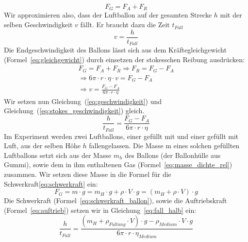 \documentclass{article}
\begin{document}
      \begin{equation} \label{eq:gleichgewicht}
          F_G = F_A + F_R
      \end{equation}
      Wir approximieren also, dass der Luftballon auf der gesamten Strecke \(h\) mit der selben Geschwindigkeit \(v\) fällt. Er braucht dazu die Zeit \(t_{Fall}\)
      \begin{equation} \label{eq:geschwindigkeit}
          v = \frac{h}{t_{Fall}}
      \end{equation}
      Die Endgeschwindigkeit des Ballons lässt sich aus dem Kräftegleichgewicht (Formel~\ref{eq:gleichgewicht}) durch einsetzen der stokesschen Reibung ausdrücken:
      \begin{equation}
          \begin{gathered} \label{eq:stokes_geschwindigkeit}
              F_G = F_A + F_R \Rightarrow F_R = F_G - F_A \\
              \Rightarrow 6 \pi \cdot r \cdot \eta \cdot v = F_G - F_A \\
              \Rightarrow v = \frac{ F_G - F_A }{ 6 \pi \cdot r \cdot \eta }
          \end{gathered}
      \end{equation}
      Wir setzen nun Gleichung~(\ref{eq:geschwindigkeit}) und Gleichung~(\ref{eq:stokes_geschwindigkeit}) gleich.
      \begin{equation} \label{eq:fall_halb}
          \frac{h}{t_{Fall}} = \frac{ F_G - F_A }{ 6 \pi \cdot r \cdot \eta }
      \end{equation}
      Im Experiment werden zwei Luftballons, einer gefüllt mit  und einer gefüllt mit Luft, aus der selben Höhe \(h\) fallengelassen.
      Die Masse m eines solchen gefüllten Luftballons setzt sich aus der Masse \( m_h \) des Ballons (der Ballonhülle aus Gummi), sowie dem in ihm enthaltenen Gas (Formel~\ref{eq:masse_dichte_rel}) zusammen.
      Wir setzen diese Masse in die Formel für die Schwerkraft\ref{eq:schwerkraft} ein:
      \begin{equation} \label{eq:schwerkraft_ballon}
          F_G = m \cdot g = m_H \cdot g + \rho \cdot V \cdot g = \left( m_H + \rho \cdot V \right) \cdot g
      \end{equation}
      Die Schwerkraft (Formel~\ref{eq:schwerkraft_ballon}), sowie die Auftriebskraft (Formel~\ref{eq:auftrieb}) setzen wir in Gleichung~\ref{eq:fall_halb} ein:
      \begin{equation} \label{eq:fall}
          \frac{h}{t_{Fall}} = \frac{ \left( m_H + \rho_{F\ddot{u}llung} \cdot V \right) \cdot g - \rho_{Medium} \cdot V \cdot g }{ 6 \pi \cdot r \cdot \eta_{Medium} }
      \end{equation}
\end{document}
